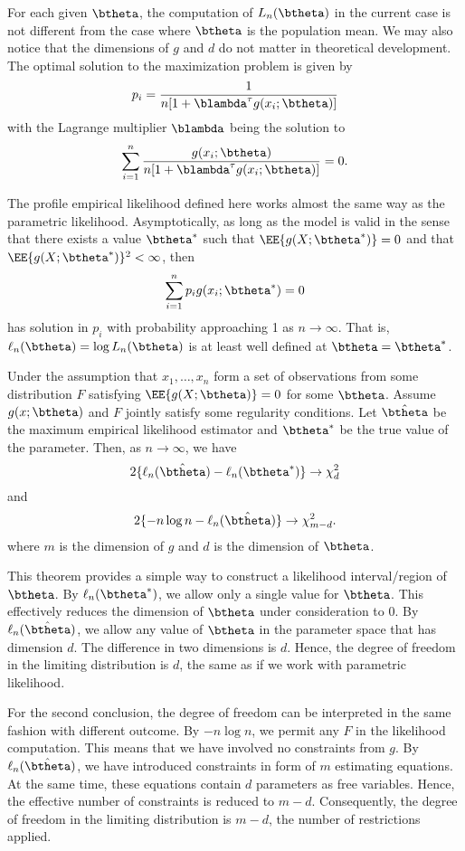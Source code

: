 For each given $\btheta$, the computation of $L_n(\btheta)$ in
the current case is not different from the case where $\btheta$
is the population mean. We may also notice that the dimensions
of $g$ and $d$ do not matter in theoretical development. 
The optimal solution to the maximization problem is given by
\[
p_i = \frac{1}{ n[1 + \blambda^\tau g(x_i; \btheta)]}
\]
with the Lagrange multiplier $\blambda$ being the solution to
\[
\sum_{i=1}^n  \frac{g(x_i; \btheta)}{ n[1 + \blambda^\tau g(x_i; \btheta)]} =0.
\]

The profile empirical likelihood defined here works almost the same
way as the parametric likelihood. Asymptotically, as long as the model
is valid in the sense that there exists a value $\btheta^*$ such that
$\EE \{ g(X; \btheta^*)\} = 0$ and that $\EE \{ g(X; \btheta^*)\}^2 < \infty$,
then 
\[
\sum_{i=1}^n p_i g(x_i; \btheta^*) = 0
\]
has solution in $p_i$ with probability approaching 1 as
$n \to \infty$. That is, 
$\ell_n(\btheta) = \log L_n(\btheta)$ is at least well defined
at $\btheta = \btheta^*$.

\begin{theorem}
Under the assumption that $x_1, \ldots, x_n$ 
form a set of \iid
observations from some distribution $F$ satisfying
$\EE \{ g(X; \btheta)\} = 0$ for some $\btheta$.
Assume $g(x; \btheta)$ and $F$ jointly
satisfy some regularity conditions.
Let $\hat \btheta$ be the maximum
empirical likelihood estimator and $\btheta^*$ be the true
value of the parameter. 
Then, as $n\to \infty$, we have
\[
2 \{ \ell_n(\hat \btheta) - \ell_n(\btheta^*) \} \to \chi^2_{d}
\]
and
\[
2 \{- n \log n -  \ell_n(\hat \btheta) \} \to \chi^2_{m-d}.
\]
where $m$ is the dimension of $g$ and $d$ is the
dimension of $\btheta$.
\end{theorem}

This theorem provides a simple way to construct a likelihood interval/region
of $\btheta$.
By $\ell_n(\btheta^*)$, we allow only a single value for $\btheta$.
This effectively reduces the dimension of $\btheta$ under consideration
to $0$.
By $\ell_n(\hat \btheta)$, we allow any value of $\btheta$
in the parameter space that has dimension $d$. 
The difference in two dimensions is $d$. Hence, the
degree of freedom in the limiting distribution is $d$,
the same as if we work with parametric likelihood.

For the second conclusion, the degree of freedom can be
interpreted in the same fashion with different outcome.
By $- n \log n$, we permit any $F$ in the likelihood computation. 
This means that we have involved no constraints from $g$.
By $\ell_n(\hat \btheta)$, we have introduced constraints
in form of $m$ estimating equations. At the same time,
these equations contain $d$ parameters as free variables.
Hence, the effective number of constraints is reduced to $m - d$. 
Consequently, the degree of freedom in the limiting distribution is $m-d$,
the number of restrictions applied.

